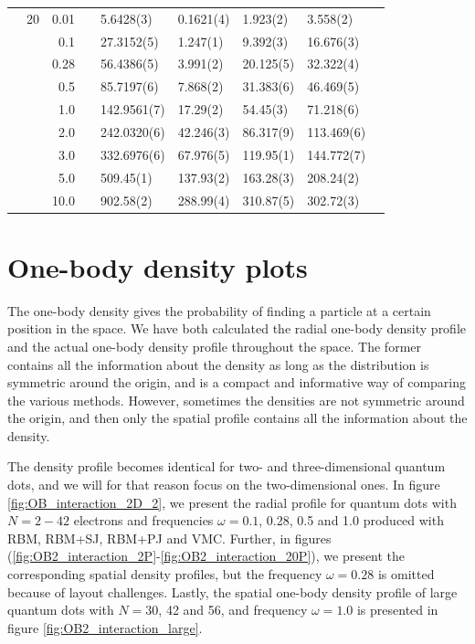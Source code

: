 \begin{table}[H]
\begin{tabularx}{\textwidth}{R{1cm}rrcR{2.3cm}R{2.3cm}R{2.3cm}R{2.3cm}R{1cm}}
		&20 & 0.01 && 5.6428(3) & 0.1621(4) & 1.923(2) & 3.558(2) \\
		&& 0.1 && 27.3152(5) & 1.247(1) & 9.392(3) & 16.676(3) \\
		&& 0.28 && 56.4386(5) & 3.991(2) & 20.125(5) & 32.322(4) \\
		&& 0.5 && 85.7197(6) & 7.868(2) & 31.383(6) & 46.469(5) \\
		&& 1.0 && 142.9561(7) & 17.29(2) & 54.45(3) & 71.218(6) \\
		&& 2.0 && 242.0320(6) & 42.246(3) & 86.317(9) & 113.469(6) \\
		&& 3.0 && 332.6976(6) & 67.976(5) & 119.95(1) & 144.772(7) \\ 
		&& 5.0 && 509.45(1) & 137.93(2) & 163.28(3) & 208.24(2) \\
		&& 10.0 && 902.58(2) & 288.99(4) & 310.87(5) & 302.72(3) \\
		\hline \hline
	\end{tabularx}
\end{table}

\newpage
\section{One-body density plots} \label{sec:onebody}
The one-body density gives the probability of finding a particle at a certain position in the space. We have both calculated the radial one-body density profile and the actual one-body density profile throughout the space. The former contains all the information about the density as long as the distribution is symmetric around the origin, and is a compact and informative way of comparing the various methods. However, sometimes the densities are not symmetric around the origin, and then only the spatial profile contains all the information about the density. 

The density profile becomes identical for two- and three-dimensional quantum dots, and we will for that reason focus on the two-dimensional ones. In figure \eqref{fig:OB_interaction_2D_2}, we present the radial profile for quantum dots with $N=2-42$ electrons and frequencies $\omega=0.1$, 0.28, 0.5 and 1.0 produced with RBM, RBM+SJ, RBM+PJ and VMC. Further, in figures (\ref{fig:OB2_interaction_2P}-\ref{fig:OB2_interaction_20P}), we present the corresponding spatial density profiles, but the frequency $\omega=0.28$ is omitted because of layout challenges. Lastly, the spatial one-body density profile of large quantum dots with $N=30$, 42 and 56, and frequency $\omega=1.0$ is presented in figure \eqref{fig:OB2_interaction_large}. 

